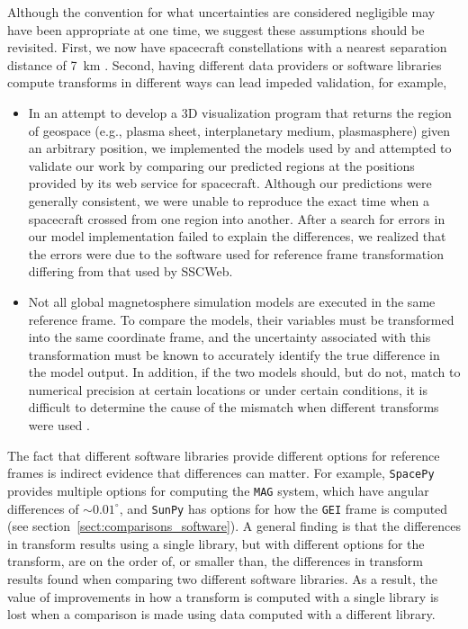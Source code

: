 \documentclass[draft]{agujournal2019}
\begin{document}
Although the convention for what uncertainties are considered negligible may have been appropriate at one time, we suggest these assumptions should be revisited. First, we now have spacecraft constellations with a nearest separation distance of 7~km \cite{NASA2016}. Second, having different data providers or software libraries compute transforms in different ways can lead impeded validation, for example, 

\begin{itemize}
\item In an attempt to develop a 3D visualization program that returns the region of geospace (e.g., plasma sheet, interplanetary medium, plasmasphere) given an arbitrary position, we implemented the models used by \cite{SSCWeb} and attempted to validate our work by comparing our predicted regions at the positions provided by its web service for spacecraft. Although our predictions were generally consistent, we were unable to reproduce the exact time when a spacecraft crossed from one region into another. After a search for errors in our model implementation failed to explain the differences, we realized that the errors were due to the software used for reference frame transformation differing from that used by SSCWeb.

\item Not all global magnetosphere simulation models are executed in the same reference frame. To compare the models, their variables must be transformed into the same coordinate frame, and the uncertainty associated with this transformation must be known to accurately identify the true difference in the model output. In addition, if the two models should, but do not, match to numerical precision at certain locations or under certain conditions, it is difficult to determine the cause of the mismatch when different transforms were used \cite{Thomas2025}. 
\end{itemize}

The fact that different software libraries provide different options for reference frames is indirect evidence that differences can matter. For example, \texttt{SpacePy} \cite{SpacePy} provides multiple options for computing the \texttt{MAG} system, which have angular differences of ${\sim}0.01^\circ$, and \texttt{SunPy} \cite{SunPy} has options for how the \texttt{GEI} frame is computed (see section~\ref{sect:comparisons_software}). A general finding is that the differences in transform results using a single library, but with different options for the transform, are on the order of, or smaller than, the differences in transform results found when comparing two different software libraries. As a result, the value of improvements in how a transform is computed with a single library is lost when a comparison is made using data computed with a different library. 
\end{document}
